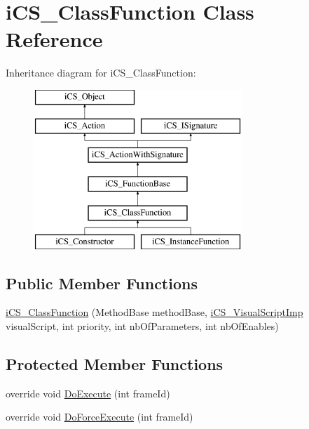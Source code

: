 \hypertarget{classi_c_s___class_function}{\section{i\+C\+S\+\_\+\+Class\+Function Class Reference}
\label{classi_c_s___class_function}
}
Inheritance diagram for i\+C\+S\+\_\+\+Class\+Function\+:\begin{figure}[H]
\begin{center}
\leavevmode
\includegraphics[height=6.000000cm]{classi_c_s___class_function}
\end{center}
\end{figure}
\subsection*{Public Member Functions}
\begin{DoxyCompactItemize}
\item 
\hyperlink{classi_c_s___class_function_a6a00afe0cbbdcd2c174f7bc601a71251}{i\+C\+S\+\_\+\+Class\+Function} (Method\+Base method\+Base, \hyperlink{classi_c_s___visual_script_imp}{i\+C\+S\+\_\+\+Visual\+Script\+Imp} visual\+Script, int priority, int nb\+Of\+Parameters, int nb\+Of\+Enables)
\end{DoxyCompactItemize}
\subsection*{Protected Member Functions}
\begin{DoxyCompactItemize}
\item 
override void \hyperlink{classi_c_s___class_function_aef24f41d4ca85cd54d9fc45c8a428ea1}{Do\+Execute} (int frame\+Id)
\item 
override void \hyperlink{classi_c_s___class_function_a4922bdd1fad3429056136e1e283f0886}{Do\+Force\+Execute} (int frame\+Id)
\end{DoxyCompactItemize}
